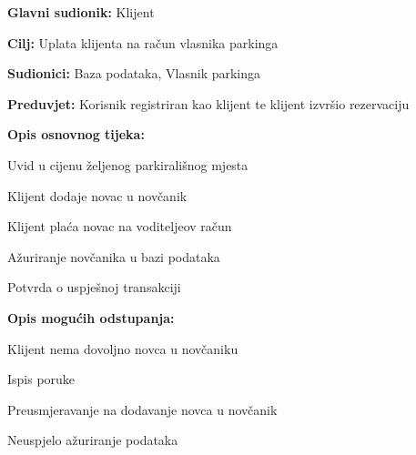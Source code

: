 \begin{packed_item}
\begin{packed_item}
\begin{packed_item}
\begin{packed_enum}
    						\end{packed_enum}
    						
    					\end{packed_item}
    				\end{packed_item}
    				\noindent {}
    			\begin{packed_item}
    				
    				\item \textbf{Glavni sudionik: } Klijent
    				\item  \textbf{Cilj:} Uplata klijenta na račun vlasnika parkinga
    				\item  \textbf{Sudionici:} Baza podataka, Vlasnik parkinga
    				\item  \textbf{Preduvjet:} Korisnik registriran kao klijent te klijent izvršio rezervaciju
    				\item  \textbf{Opis osnovnog tijeka:}
    				
    				\item[] \begin{packed_enum}
    					
    					\item Uvid u cijenu željenog parkirališnog mjesta
    					\item Klijent dodaje novac u novčanik
    					\item Klijent plaća novac na voditeljeov račun
    					\item Ažuriranje novčanika u bazi podataka
    					\item Potvrda o uspješnoj transakciji

    				\end{packed_enum}
    				
    				\item  \textbf{Opis mogućih odstupanja:}
    				
    				\item[] \begin{packed_item}
    					
    					\item[2.a] Klijent nema dovoljno novca u novčaniku
    					\item[] \begin{packed_enum}
    						
    						\item Ispis poruke
    						\item Preusmjeravanje na dodavanje novca u novčanik
    						
    					\end{packed_enum}
    					\item[3.a] Neuspjelo ažuriranje podataka
						\item[] \begin{packed_enum}
							

\end{packed_enum}
\end{packed_item}
\end{packed_item}
\end{packed_item}
